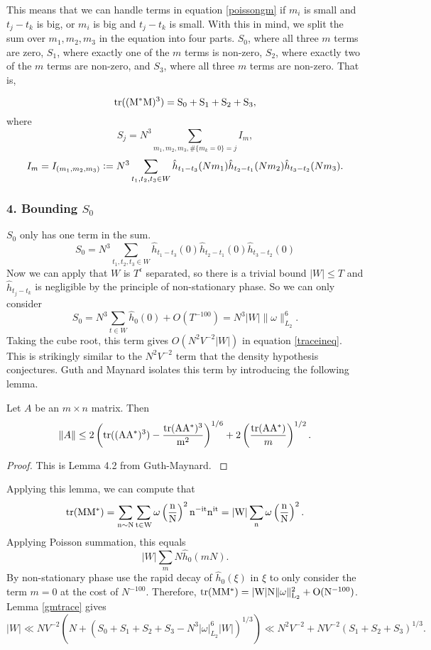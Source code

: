 This means that we can handle terms in equation \ref{poissongm} if $m_i$ is small and $t_j-t_k$ is big, or  $m_i$ is big and $t_j-t_k$ is small. With this in mind, we split the sum over $m_1,m_2,m_3$ in the equation into four parts. $S_0$, where all three $m$ terms are zero, $S_1$, where exactly one of the $m$ terms is non-zero, $S_2$, where exactly two of the $m$ terms are non-zero, and $S_3$, where all three $m$ terms are non-zero.
That is,

\[\rm{tr}((M^*M)^3)= S_0+S_1+S_2+S_3, \]
where \[
S_j = N^3\sum_{m_1,m_2,m_3, \#\{m_k=0\}=j} I_m,
\]
\[
I_m=I_{(m_1,m_2,m_3)}\mathrel{\mathop:}= N^3\sum_{t_1,t_2,t_3\in W}\hat{h}_{t_1-t_3}(Nm_1)\hat{h}_{t_2-t_1}(Nm_2)\hat{h}_{t_3-t_2}(Nm_3).
\]

\subsubsection*{4. Bounding $S_0$}
$S_0$ only has one term in the sum. \[
S_0 = N^3\sum_{t_1,t_2,t_3\in W} \hat{h}_{t_1-t_3}(0)\hat{h}_{t_2-t_1}(0)\hat{h}_{t_3-t_2}(0)
\]
Now we can apply that $W$ is $T^\epsilon$ separated, so there is a trivial bound $|W|\leq T$ and $\hat{h}_{t_j-t_k}$ is negligible by the principle of non-stationary phase. So we can only consider \[
S_0 = N^3\sum_{t\in W}\hat{h}_0(0) + O(T^{-100}) = N^3|W|\|\omega\|_{L_2}^6.
\]Taking the cube root, this term gives $O(N^2V^{-2}|W|)$ in equation \ref{traceineq}. This is strikingly similar to the $N^2V^{-2}$ term that the density hypothesis conjectures. Guth and Maynard isolates this term by introducing the following lemma.
\begin{lemma}\label{gmtrace}
    Let $A$ be an $m\times n$ matrix. Then 
    \[\|A\| \leq 2\left(\rm{tr}((AA^*)^3)-\frac{\rm{tr}(AA^*)^3}{m^2}\right)^{1/6}+2\left(\frac{\rm{tr}(AA^*)}{m}\right)^{1/2}.
    \]
\end{lemma}
\begin{proof}
    This is Lemma 4.2 from Guth-Maynard. \cite{GM2024}
\end{proof}
Applying this lemma, we can compute that \[
    \rm{tr}(MM^*) =\sum_{n\sim N} \sum_{t\in W} \omega\left(\frac{n}{N}\right)^2 n^{-it} n^{it}= |W|\sum_n \omega\left(\frac{n}{N}\right)^2.
\]
Applying Poisson summation, this equals \[
    |W|\sum_m N \hat{h}_0(mN).
\]
By non-stationary phase use the rapid decay of $\hat{h}_0(\xi)$ in $\xi$ to only consider the term $m=0$ at the cost of $N^{-100}$.
Therefore, $\rm{tr}(MM^*)=|W|N\|\omega\|_{L_2}^2+O(N^{-100})$.
Lemma \ref{gmtrace} gives \[
|W|\ll NV^{-2}(N+(S_0+S_1+S_2+S_3-N^3|\omega|_{L_2}^6|W|)^{1/3}) \ll N^2V^{-2}+  NV^{-2}(S_1+S_2+S_3)^{1/3}. 
\]


